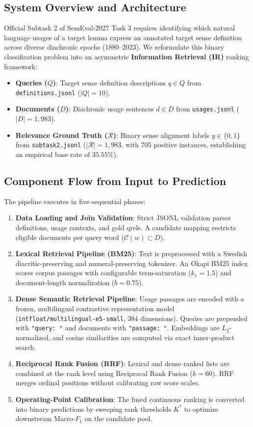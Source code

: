 \subsection{System Overview and Architecture}
Official Subtask 2 of SemEval-2027 Task 3 requires identifying which natural language usages of a target lemma express an annotated target sense definition across diverse diachronic epochs (1880--2023). We reformulate this binary classification problem into an asymmetric \textbf{Information Retrieval (IR)} ranking framework:
\begin{itemize}
    \item \textbf{Queries ($Q$)}: Target sense definition descriptions $q \in Q$ from \texttt{definitions.jsonl} ($|Q| = 10$).
    \item \textbf{Documents ($D$)}: Diachronic usage sentences $d \in D$ from \texttt{usages.jsonl} ($|D| = 1,983$).
    \item \textbf{Relevance Ground Truth ($\mathcal{R}$)}: Binary sense alignment labels $y \in \{0, 1\}$ from \texttt{subtask2.jsonl} ($|\mathcal{R}| = 1,983$, with 705 positive instances, establishing an empirical base rate of $35.55\%$).
\end{itemize}

\subsection{Component Flow from Input to Prediction}
The pipeline executes in five sequential phases:
\begin{enumerate}
    \item \textbf{Data Loading and Join Validation}: Strict JSONL validation parses definitions, usage contexts, and gold qrels. A candidate mapping restricts eligible documents per query word ($\mathcal{C}(w) \subset D$).
    \item \textbf{Lexical Retrieval Pipeline (BM25)}: Text is preprocessed with a Swedish diacritic-preserving and numeral-preserving tokenizer. An Okapi BM25 index scores corpus passages with configurable term-saturation ($k_1 = 1.5$) and document-length normalization ($b = 0.75$).
    \item \textbf{Dense Semantic Retrieval Pipeline}: Usage passages are encoded with a frozen, multilingual contrastive representation model (\texttt{intfloat/multilingual-e5-small}, 384 dimensions). Queries are prepended with \texttt{"query: "} and documents with \texttt{"passage: "}. Embeddings are $L_2$-normalized, and cosine similarities are computed via exact inner-product search.
    \item \textbf{Reciprocal Rank Fusion (RRF)}: Lexical and dense ranked lists are combined at the rank level using Reciprocal Rank Fusion ($k = 60$). RRF merges ordinal positions without calibrating raw score scales.
    \item \textbf{Operating-Point Calibration}: The fused continuous ranking is converted into binary predictions by sweeping rank thresholds $K^*$ to optimize downstream Macro-$F_1$ on the candidate pool.
\end{enumerate}

